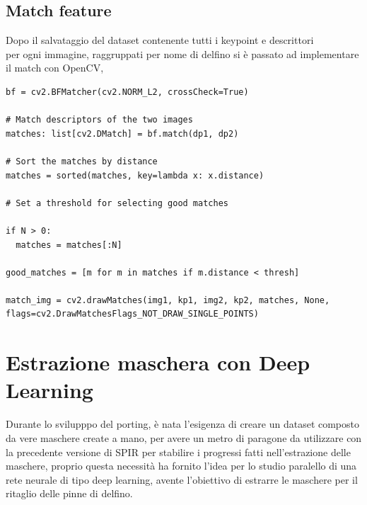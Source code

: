 \documentclass[a4paper,12pt]{report}
\begin{document}
      \subsection{Match feature}
      Dopo il salvataggio del dataset contenente tutti i keypoint e descrittori 
      \\ per ogni immagine, raggruppati per nome di delfino si è passato ad implementare il match con OpenCV,
      \begin{lstlisting}
bf = cv2.BFMatcher(cv2.NORM_L2, crossCheck=True)

# Match descriptors of the two images
matches: list[cv2.DMatch] = bf.match(dp1, dp2)

# Sort the matches by distance
matches = sorted(matches, key=lambda x: x.distance)

# Set a threshold for selecting good matches

if N > 0:
  matches = matches[:N]

good_matches = [m for m in matches if m.distance < thresh]

match_img = cv2.drawMatches(img1, kp1, img2, kp2, matches, None, flags=cv2.DrawMatchesFlags_NOT_DRAW_SINGLE_POINTS)

      \end{lstlisting}

      \newpage
    \section{Estrazione maschera con Deep Learning}
      Durante lo svilupppo del porting, è nata l'esigenza di creare un dataset
      composto da vere maschere create a mano, per avere un metro di paragone da
      utilizzare con la precedente versione di SPIR per stabilire i progressi fatti nell'estrazione
      delle maschere, proprio questa necessità ha fornito l'idea per lo studio paralello di
      una rete neurale di tipo deep learning, avente l'obiettivo di estrarre le maschere per il 
      ritaglio delle pinne di delfino.
\end{document}
